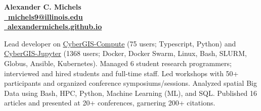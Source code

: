 \documentclass{acmresume}
\begin{document}
	
	\begin{multicols}{2}
		\textbf{\huge Alexander C. Michels}\\ \columnbreak
        \hfill\href{mailto:michels9@illinois.edu}{\textbf{\faEnvelope~michels9@illinois.edu}} \\
        \hfill\href{http://alexandermichels.github.io}{\faGlobeAmericas~\textbf{alexandermichels.github.io}} \\
	\end{multicols}
    \vspace*{-.25cm}



	
	
		
		
	
	
        \begin{titemize}
            \titem Lead developer on \href{https://github.com/cybergis/cybergis-compute-python-sdk}{CyberGIS-Compute} (75 users; Typescript, Python) and \href{https://cybergisx.cigi.illinois.edu/}{CyberGIS-Jupyter} (1368 users; Docker, Docker Swarm, Linux, Bash, SLURM, Globus, Ansible, Kubernetes).
            \titem Managed 6 student research programmers; interviewed and hired students and full-time staff.
            \titem Led workshops with 50+ participants and organized conference symposiums/sessions.
            \titem Analyzed spatial Big Data using Bash, HPC, Python, Machine Learning (ML), and SQL.
            \titem Published 16 articles and presented at 20+ conferences, garnering 200+ citations.
        \end{titemize}
\end{document}
